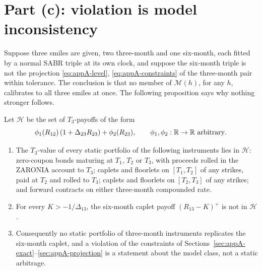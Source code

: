 \documentclass[../../main.tex]{subfiles}
\begin{document}
\section{Part (c): violation is model inconsistency}\label{sec:appA-inconsistency}

Suppose three smiles are given, two three-month and one six-month, each fitted by a normal SABR triple at its own clock, and suppose the six-month triple is not the projection \eqref{eq:appA-level}, \eqref{eq:appA-constraints} of the three-month pair within tolerance. The conclusion is that no member of $\mathcal M(h)$, for any $h$, calibrates to all three smiles at once. The following proposition says why nothing stronger follows.

\begin{proposition}\label{prop:appA-span}
Let $\mathcal H$ be the set of $T_3$-payoffs of the form
\[
\phi_1(R_{12})\,(1+\Delta_{23}R_{23})+\phi_2(R_{23}),\qquad \phi_1,\phi_2:\mathbb{R}\to\mathbb{R}\ \text{arbitrary}.
\]
\begin{enumerate}[nosep,label=(\roman*)]
\item The $T_3$-value of every static portfolio of the following instruments lies in $\mathcal H$: zero-coupon bonds maturing at $T_1$, $T_2$ or $T_3$, with proceeds rolled in the ZARONIA account to $T_3$; caplets and floorlets on $[T_1,T_2]$ of any strikes, paid at $T_2$ and rolled to $T_3$; caplets and floorlets on $[T_2,T_3]$ of any strikes; and forward contracts on either three-month compounded rate.
\item For every $K>-1/\Delta_{13}$, the six-month caplet payoff $(R_{13}-K)^+$ is not in $\mathcal H$.
\item Consequently no static portfolio of three-month instruments replicates the six-month caplet, and a violation of the constraints of Sections~\ref{sec:appA-exact}--\ref{sec:appA-projection} is a statement about the model class, not a static arbitrage.
\end{enumerate}
\end{proposition}
\end{document}
